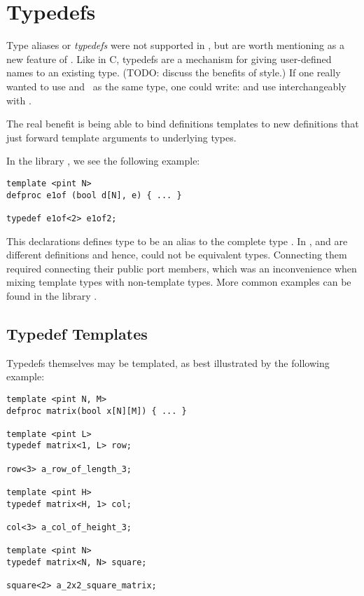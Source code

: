 
\section{Typedefs}
\label{sec:typedefs}

Type aliases or \emph{typedefs} were not supported in \CAST, 
but are worth mentioning as a new feature of \hac.  
Like in C, typedefs are a mechanism for giving user-defined names
to an existing type.  
(TODO: discuss the benefits of style.)
If one really wanted to use  and \bool\ as the same type, 
one could write: 
and use  interchangeably with \bool.  

The real benefit is being able to bind definitions templates
to new definitions that just forward template arguments to
underlying types.  

In the library , we see the following example:

\begin{verbatim}
template <pint N>
defproc e1of (bool d[N], e) { ... }

typedef	e1of<2> e1of2;
\end{verbatim}

This declarations defines type  to be an alias
to the complete type .  
In \CAST,  and  are different definitions and hence,
could not be equivalent types.  
Connecting them required connecting their public port members, 
which was an inconvenience when mixing template types with non-template types.  
More common examples can be found in the library .  

\subsection{Typedef Templates}
\label{sec:typedefs:templates}

Typedefs themselves may be templated, as best illustrated by 
the following example:

\begin{verbatim}
template <pint N, M>
defproc matrix(bool x[N][M]) { ... }

template <pint L>
typedef matrix<1, L> row;

row<3> a_row_of_length_3;

template <pint H>
typedef matrix<H, 1> col;

col<3> a_col_of_height_3;

template <pint N>
typedef matrix<N, N> square;

square<2> a_2x2_square_matrix;
\end{verbatim}

